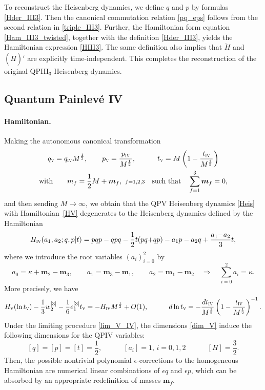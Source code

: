 \documentclass[12pt,a4paper]{article}
\numberwithin{equation}{section}
\newcommand{\V}{\scalebox{.6}{V}}
\newcommand{\IV}{\scalebox{.6}{IV}}
\begin{document}
To reconstruct the Heisenberg dynamics, we define $q$ and $p$ by formulas \eqref{Hder_III3}.
Then the canonical commutation relation \eqref{pq_eps} follows from the second relation in \eqref{triple_III3}. Further, the Hamiltonian form equation \eqref{Ham_III3_twisted}, together with the definition \eqref{Hder_III3}, yields the Hamiltonian expression \eqref{HIII3}. The same definition also implies that $\dot{H}$ and $(\dot{H})'$ are explicitly time-independent. This completes the reconstruction of the original QPIII$_3$ Heisenberg dynamics.

\subsection{Quantum Painlev\'e IV}
\label{ssec:QPIV}
\paragraph{Hamiltonian.}
Making the autonomous canonical transformation
\begin{multline}\label{lim_V_IV}
 q_{\V}=q_{\IV}M^{\frac12}, \qquad p_{\V}=\frac{p_{\IV}}{M^{\frac12}}, \qquad \quad t_{\V}=M\left(1-\frac{t_{\IV}}{M^{\frac12}}\right)   \\ \textrm{with} \qquad 
m_f=\frac12M+\boldsymbol{m}_f,\,\, {\scriptstyle f=1,2,3} \quad \textrm{such that} \quad \sum_{f=1}^3\boldsymbol{m}_f=0,
 \end{multline}
 and then sending $M\rightarrow\infty$, we obtain that the QPV Heisenberg dynamics \eqref{Heis} with Hamiltonian~\eqref{HV} degenerates to the Heisenberg dynamics defined by the Hamiltonian 
 \begin{equation}\label{HIV}
 H_{\IV}(a_1,a_2;q,p|t)=pqp-qpq-\frac12t(pq{+}qp)-a_1p-a_2q+\frac{a_1{-}a_2}3t, 
 \end{equation}
  where we introduce the root variables $(a_i)_{i=0}^2$ by
\begin{equation}
a_0=\kappa+\boldsymbol{m}_2{-}\boldsymbol{m}_3, \qquad a_1=\boldsymbol{m}_3{-}\boldsymbol{m}_1, \qquad a_2=\boldsymbol{m_1}{-}\boldsymbol{m}_2 \quad \Rightarrow \quad \sum_{i=0}^2a_i=\kappa. 
\end{equation}
More precisely, we have
\begin{equation}
H_{\V}(\ln t_{\V})-\frac13w_2^{[3]}-\frac16e_1^{[3]}t_{\V}=-H_{\IV}M^{\frac12}+O(1), \qquad \quad  d\ln t_{\V}=-\frac{dt_{\IV}}{M^{\frac12}}\left(1-\frac{t_{\IV}}{M^{\frac12}}\right)^{-1}.  
\end{equation}
Under the limiting procedure \eqref{lim_V_IV}, the dimensions \eqref{dim_V} induce the following dimensions for the QPIV variables:
\begin{equation}\label{dim_IV}
[q]=[p]=[t]=\frac12, \qquad \quad  [a_i]=1,\, {\scriptstyle i=0,1,2} \qquad \quad [H]=\frac32.
\end{equation}
Then, the possible nontrivial polynomial $\epsilon$-corrections to the homogeneous Hamiltonian are numerical linear combinations of $\epsilon q$ and $\epsilon p$, which can be absorbed by an appropriate redefinition of masses $\boldsymbol{m}_f$. 
\end{document}
